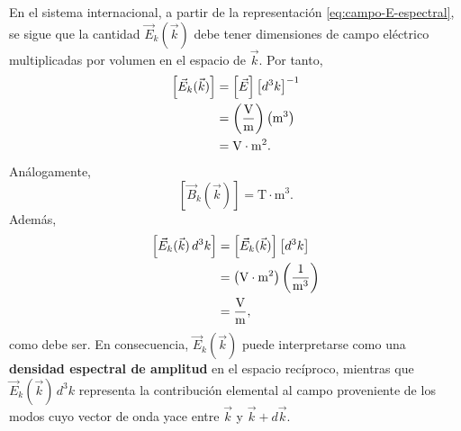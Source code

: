 \documentclass[../main.tex]{subfiles}
\begin{document}
En el sistema internacional, a partir de la representación \eqref{eq:campo-E-espectral}, se sigue que la cantidad $\vec E_k(\vec k)$ debe tener dimensiones de campo eléctrico multiplicadas por volumen en el espacio de $\vec k$. Por tanto,
\begin{align*}
    \left[\vec E_k(\vec k)\right]
    &=\left[\vec E\right]\left[d^3k\right]^{-1} \notag\\
    &=\left(\frac{\mathrm{V}}{\mathrm{m}}\right)\left(\mathrm{m}^3\right) \notag\\
    &=\mathrm{V}\cdot \mathrm{m}^2.
\end{align*}
Análogamente,
\begin{equation*}
    \left[\vec B_k(\vec k)\right]=\mathrm{T}\cdot \mathrm{m}^3.
\end{equation*}
Además,
\begin{align*}
    \left[\vec E_k(\vec k)\,d^3k\right]
    &=\left[\vec E_k(\vec k)\right]\left[d^3k\right] \notag\\
    &=\left(\mathrm{V}\cdot \mathrm{m}^2\right)\left(\frac{1}{\mathrm{m}^3}\right) \notag\\
    &=\frac{\mathrm{V}}{\mathrm{m}},
\end{align*}
como debe ser. En consecuencia, $\vec E_k(\vec k)$ puede interpretarse como una \textbf{densidad espectral de amplitud} en el espacio recíproco, mientras que $\vec E_k(\vec k)\,d^3k$ representa la contribución elemental al campo proveniente de los modos cuyo vector de onda yace entre $\vec k$ y $\vec k+d\vec k$.
\end{document}
